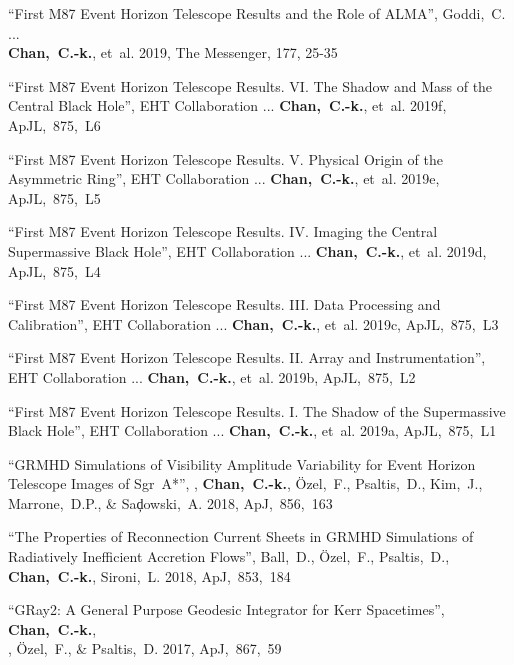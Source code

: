 \begin{ilist}
\item ``First M87 Event Horizon Telescope Results and the Role of ALMA'',
  Goddi,~C. ...\\ \textbf{Chan,~C.-k.}, et~al.
  2019, The Messenger, 177, 25-35

\item ``First M87 Event Horizon Telescope Results. VI. The Shadow and Mass of the Central Black Hole'',
  EHT Collaboration ... \textbf{Chan,~C.-k.}, et~al.
  2019f, ApJL,~875,~L6

\item ``First M87 Event Horizon Telescope Results. V. Physical Origin of the Asymmetric Ring'',
  EHT Collaboration ... \textbf{Chan,~C.-k.}, et~al.
  2019e, ApJL,~875,~L5

\item ``First M87 Event Horizon Telescope Results. IV. Imaging the Central Supermassive Black Hole'',
  EHT Collaboration ... \textbf{Chan,~C.-k.}, et~al.
  2019d, ApJL,~875,~L4

\item ``First M87 Event Horizon Telescope Results. III. Data Processing and Calibration'',
  EHT Collaboration ... \textbf{Chan,~C.-k.}, et~al.
  2019c, ApJL,~875,~L3

\item ``First M87 Event Horizon Telescope Results. II. Array and Instrumentation'',
  EHT Collaboration ... \textbf{Chan,~C.-k.}, et~al.
  2019b, ApJL,~875,~L2

\item ``First M87 Event Horizon Telescope Results. I. The Shadow of the Supermassive Black Hole'',
  EHT Collaboration ... \textbf{Chan,~C.-k.}, et~al.
  2019a, ApJL,~875,~L1

\item ``GRMHD Simulations of Visibility Amplitude Variability for Event Horizon Telescope Images of Sgr~A*'',
  , \textbf{Chan,~C.-k.}, {\"O}zel,~F., Psaltis,~D., Kim,~J., Marrone,~D.P., \& Sa{\c d}owski,~A.
  2018, ApJ,~856,~163

\item ``The Properties of Reconnection Current Sheets in GRMHD Simulations of Radiatively Inefficient Accretion Flows'',
  Ball,~D., {\"O}zel,~F., Psaltis,~D., \textbf{Chan,~C.-k.}, Sironi,~L.
  2018, ApJ,~853,~184

\item ``GRay2: A General Purpose Geodesic Integrator for Kerr Spacetimes'',
  \textbf{Chan,~C.-k.},\\ , {\"O}zel,~F., \& Psaltis,~D.
  2017, ApJ,~867,~59


\end{ilist}
